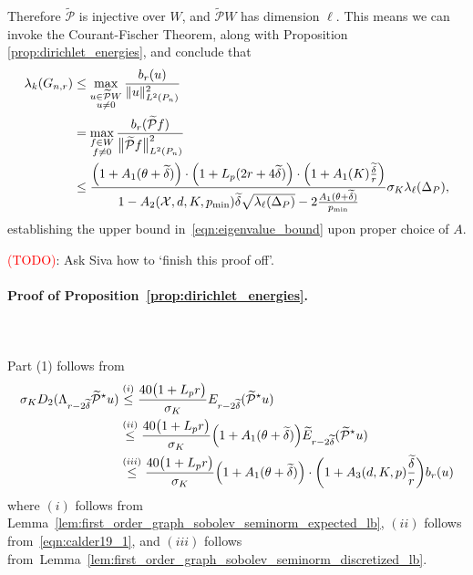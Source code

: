 \documentclass{article}
\newcommand{\1}{\mathbf{1}}
\newcommand{\Xset}{\mathcal{X}}
\newcommand{\Leb}{L}
\newcommand{\mc}[1]{\mathcal{#1}}
\newcommand{\wt}[1]{\widetilde{#1}}
\theoremstyle{alden}
\theoremstyle{aldenthm}
\theoremstyle{definition}
\theoremstyle{remark}
\begin{document}
Therefore $\wt{\mc{P}}$ is injective over $W$, and $\wt{\mc{P}}W$ has dimension $\ell$. This means we can invoke the Courant-Fischer Theorem, along with Proposition \ref{prop:dirichlet_energies}, and conclude that
\begin{align*}
\lambda_k(G_{n,r}) & \leq \max_{\substack{u \in \wt{\mc{P}}W \\ u \neq 0} } \frac{b_r(u)}{\|u\|_{\Leb^2(P_n)}^2} \\
& = \max_{\substack{f \in W \\ f \neq 0} } \frac{b_r(\wt{\mc{P}}f)}{\bigl\|\wt{\mc{P}}f\bigr\|_{\Leb^2(P_n)}^2} \\
& \leq \frac{\Bigl(1 + A_1(\theta + \wt{\delta})\Bigr) \cdot \Bigl(1 + L_p(2r + 4\wt{\delta})\Bigr) \cdot \Bigl(1 + A_1(K)\frac{\wt{\delta}}{r}\Bigr)}{1 - A_2(\Xset,d,K,p_{\min}) \wt{\delta} \sqrt{\lambda_{\ell}(\Delta_P)} - 2\frac{A_1(\theta + \wt{\delta})}{p_{\min}}} \sigma_K \lambda_{\ell}(\Delta_P),
\end{align*}
establishing the upper bound in~\eqref{eqn:eigenvalue_bound} upon proper choice of $A$.

\textcolor{red}{(TODO)}: Ask Siva how to `finish this proof off'. 


\paragraph{Proof of Proposition~\ref{prop:dirichlet_energies}.}
\mbox{} \\
\mbox{} \\
Part (1) follows from
\begin{align*}
\sigma_K D_2(\Lambda_{r - 2\wt{\delta}} \wt{\mc{P}}^{\star}u) & \overset{(i)}{\leq} \frac{40 \bigl(1 + L_p r\bigr)}{\sigma_K} E_{r - 2\wt{\delta}}(\wt{\mc{P}}^{\star}u) \\
& \overset{(ii)}{\leq} \frac{40 \bigl(1 + L_p r\bigr)}{\sigma_K} \Bigl(1 + A_1(\theta + \wt{\delta})\Bigr) \wt{E}_{r - 2\wt{\delta}}(\wt{\mc{P}}^{\star}u) \\
& \overset{(iii)}{\leq} \frac{40 \bigl(1 + L_p r\bigr)}{\sigma_K} \Bigl(1 + A_1(\theta + \wt{\delta})\Bigr) \cdot \biggl(1 + A_3(d,K,p)\frac{\wt{\delta}}{r}\biggr) b_r(u)
\end{align*}
where $(i)$ follows from Lemma~\ref{lem:first_order_graph_sobolev_seminorm_expected_lb}, $(ii)$ follows from~\eqref{eqn:calder19_1}, and $(iii)$ follows from~Lemma~\ref{lem:first_order_graph_sobolev_seminorm_discretized_lb}.
\end{document}
